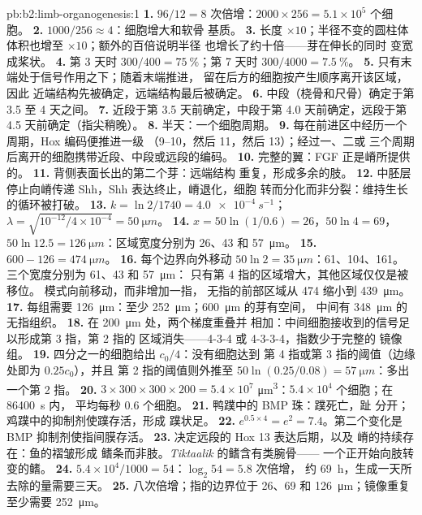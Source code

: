 \begin{solution}{pb:b2:limb-organogenesis:1}
\textbf{1.} $96/12 = 8$ 次倍增：$2000\times 256 = 5.1\times 10^{5}$
个细胞。
\textbf{2.} $1000/256 \approx 4$：细胞增大和软骨
基质。
\textbf{3.} 长度 $\times 10$；半径不变的圆柱体
体积也增至 $\times 10$；额外的百倍说明半径
也增长了约十倍——芽在伸长的同时
变宽成桨状。
\textbf{4.} 第 3 天时 $300/400 = \qty{75}{\%}$；第 7 天时 $300/4000 =
\qty{7.5}{\%}$。
\textbf{5.} 只有末端处于信号作用之下；随着末端推进，
留在后方的细胞按产生顺序离开该区域，因此
近端结构先被确定，远端结构最后被确定。
\textbf{6.} 中段（桡骨和尺骨）确定于第 3.5 至
4 天之间。
\textbf{7.} 近段于第 3.5 天前确定，中段于第 4.0 天前确定，远段于第 4.5
天前确定（指尖稍晚）。
\textbf{8.} 半天：一个细胞周期。
\textbf{9.} 每在前进区中经历一个周期，Hox 编码便推进一级
（9--10，然后 11，然后 13）；经过一、二或
三个周期后离开的细胞携带近段、中段或远段的编码。
\textbf{10.} 完整的翼：FGF 正是嵴所提供的。
\textbf{11.} 背侧表面长出的第二个芽：远端结构
重复，形成多余的肢。
\textbf{12.} 中胚层停止向嵴传递 Shh，Shh
表达终止，嵴退化，细胞
转而分化而非分裂：维持生长的循环被打破。
\textbf{13.} $k = \ln 2/1740 = \qty{4.0e-4}{s^{-1}}$；$\lambda =
\sqrt{10^{-12}/4\times 10^{-4}} = \qty{50}{\micro m}$。
\textbf{14.} $x = 50\ln(1/0.6) = 26$，$50\ln 4 = 69$，$50\ln 12.5 =
\qty{126}{\micro m}$：区域宽度分别为 26、43 和 \qty{57}{\micro m}。
\textbf{15.} $600 - 126 = \qty{474}{\micro m}$。
\textbf{16.} 每个边界向外移动 $50\ln 2 = \qty{35}{\micro
m}$：61、104、161。三个宽度分别为 61、43 和 \qty{57}{\micro m}：
只有第 4 指的区域增大，其他区域仅仅是被移位。
模式向前移动，而非增加一指，
无指的前部区域从 474 缩小到 \qty{439}{\micro m}。
\textbf{17.} 每组需要 \qty{126}{\micro m}：至少
\qty{252}{\micro m}；\qty{600}{\micro m} 的芽有空间，
中间有 \qty{348}{\micro m} 的无指组织。
\textbf{18.} 在 \qty{200}{\micro m} 处，两个梯度重叠并
相加：中间细胞接收到的信号足以形成第 3 指，第 2 指的
区域消失——4-3-4 或 4-3-3-4，指数少于完整的
镜像组。
\textbf{19.} 四分之一的细胞给出 $c_0/4$：没有细胞达到
第 4 指或第 3 指的阈值（边缘处即为 $0.25 c_0$），并且
第 2 指的阈值则外推至 $50\ln(0.25/0.08) =
\qty{57}{\micro m}$：多出一个第 2 指。
\textbf{20.} $3\times 300\times 300\times 200 = 5.4\times 10^{7}$
\unit{\micro m^3}：$5.4\times 10^{4}$ 个细胞；在 \qty{86400}{s} 内，
平均每秒 $0.6$ 个细胞。
\textbf{21.} 鸭蹼中的 BMP 珠：蹼死亡，趾
分开；鸡蹼中的抑制剂使蹼存活，形成
蹼状足。
\textbf{22.} $e^{0.5\times 4} = e^{2} = 7.4$。第二个变化是
BMP 抑制剂使指间膜存活。
\textbf{23.} 决定远段的 Hox 13 表达后期，以及
嵴的持续存在：鱼的褶皱形成
鳍条而非肢。\emph{Tiktaalik} 的鳍含有类腕骨——
一个正开始向肢转变的鳍。
\textbf{24.} $5.4\times 10^{4}/1000 = 54$：$\log_2 54 = 5.8$ 次倍增，
约 \qty{69}{h}，生成一天所去除的量需要三天。
\textbf{25.} 八次倍增；指的边界位于 26、69 和
\qty{126}{\micro m}；镜像重复至少需要
\qty{252}{\micro m}。
\end{solution}
